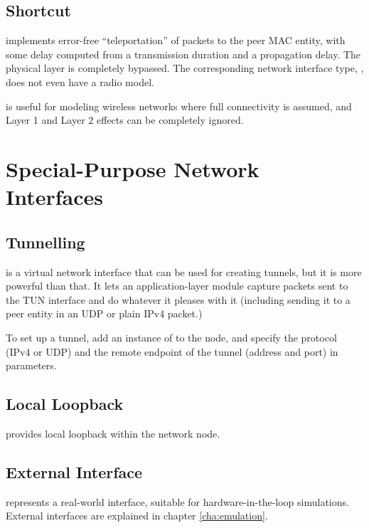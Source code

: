 \subsection{Shortcut}

 implements error-free ``teleportation'' of packets 
to the peer MAC entity, with some delay computed from a transmission 
duration and a propagation delay. The physical layer is completely bypassed.
The corresponding network interface type, ,
does not even have a radio model.

 is useful for modeling wireless networks
where full connectivity is assumed, and Layer 1 and Layer 2 effects
can be completely ignored. 

\section{Special-Purpose Network Interfaces}

 
\subsection{Tunnelling}

 is a virtual network interface that can be used 
for creating tunnels, but it is more powerful than that.
It lets an application-layer module capture packets sent to 
the TUN interface and do whatever it pleases with it (including
sending it to a peer entity in an UDP or plain IPv4 packet.)

To set up a tunnel, add an instance of  to 
the node, and specify the protocol (IPv4 or UDP) and the remote
endpoint of the tunnel (address and port) in parameters. 

\subsection{Local Loopback}

 provides local loopback within the network node.

\subsection{External Interface}

 represents a real-world interface, suitable for 
hardware-in-the-loop simulations. External interfaces are explained in 
chapter \ref{cha:emulation}.

